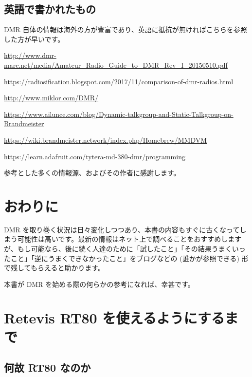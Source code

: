 \documentclass[a4j,oneside]{ujbook}
\begin{document}
\section{英語で書かれたもの}

DMR 自体の情報は海外の方が豊富であり、英語に抵抗が無ければこちらを参照した方が早いです。

\begin{description}[style=nextline]
 \item[Amateur Radio Guide to Digital Mobile Radio (DMR) (DMR-MARC)] \url{http://www.dmr-marc.net/media/Amateur_Radio_Guide_to_DMR_Rev_I_20150510.pdf}
 \item[Comparison of DMR radios (Radiosification)] \url{https://radiosification.blogspot.com/2017/11/comparison-of-dmr-radios.html}
 \item[DMR Info Site (K3NXU)] \url{http://www.miklor.com/DMR/}
 \item[Dynamic talkgroup and Static Talkgroup on Brandmeister (Ailunce)] \url{https://www.ailunce.com/blog/Dynamic-talkgroup-and-Static-Talkgroup-on-Brandmeister}
 \item[Homebrew/MMDVM (BrandMeister)] \url{https://wiki.brandmeister.network/index.php/Homebrew/MMDVM}
 \item[You and Your Tytera MD-380 DMR (Adafruit)] \url{https://learn.adafruit.com/tytera-md-380-dmr/programming}
\end{description}

参考とした多くの情報源、およびその作者に感謝します。

\chapter{おわりに}

DMR を取り巻く状況は日々変化しつつあり、本書の内容もすぐに古くなってしまう可能性は高いです。最新の情報はネット上で調べることをおすすめしますが、もし可能なら、後に続く人達のために「試したこと」「その結果うまくいったこと」「逆にうまくできなかったこと」をブログなどの (誰かが参照できる) 形で残してもらえると助かります。

本書が DMR を始める際の何らかの参考になれば、幸甚です。

\appendix
\chapter{Retevis RT80 を使えるようにするまで}

\section{何故 RT80 なのか}
\end{document}
